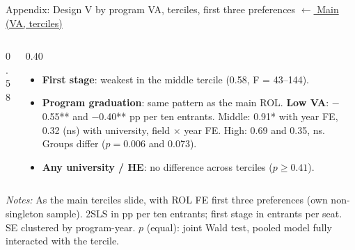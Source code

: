 \documentclass{beamer}
\begin{document}
\begin{frame}[label=d5-app-va-terciles-top3]{Appendix: Design V by program VA, terciles, first three preferences}
\vspace{-0.3cm}
\hyperlink{d5-va-terciles}{\tiny\color{blue}$\leftarrow$ Main (VA, terciles)}

\begin{columns}[T,onlytextwidth]
\begin{column}{0.58\textwidth}
\centering
\tiny
\resizebox{\linewidth}{!}{}
\end{column}
\begin{column}{0.40\textwidth}
\scriptsize
\begin{itemize}
    \setlength{\itemsep}{3pt}
    \item \textbf{First stage}: weakest in the middle tercile (0.58, F = 43--144).
    \item \textbf{Program graduation}: same pattern as the main ROL. \textbf{Low VA}: $-$0.55** and $-$0.40** pp per ten entrants. Middle: 0.91* with year FE, 0.32 (ns) with university, field $\times$ year FE. High: 0.69 and 0.35, ns. Groups differ ($p=0.006$ and 0.073).
    \item \textbf{Any university / HE}: no difference across terciles ($p\geq0.41$).
\end{itemize}
\end{column}
\end{columns}

\vspace{0.05cm}
\parbox{0.97\textwidth}{\tiny \textit{Notes:} As the main terciles slide, with ROL FE first three preferences (own non-singleton sample). 2SLS in pp per ten entrants; first stage in entrants per seat. SE clustered by program-year. $p$ (equal): joint Wald test, pooled model fully interacted with the tercile.}
\end{frame}
\end{document}
